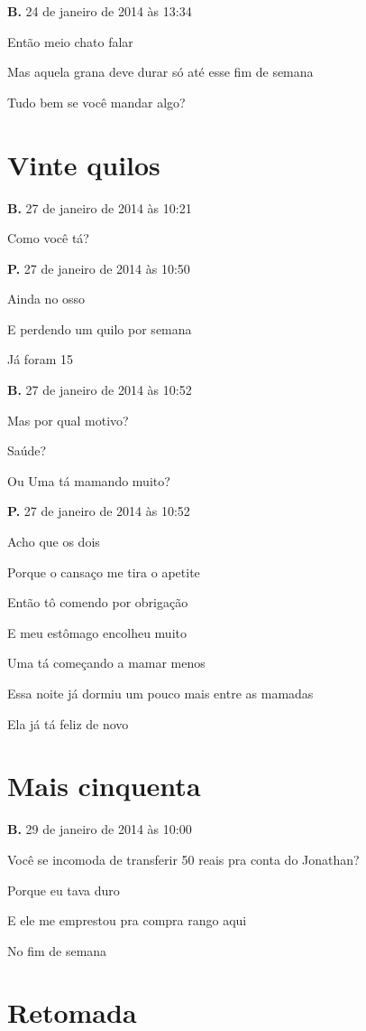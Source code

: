 \textbf{B.} 24 de janeiro de 2014 às 13:34

Então meio chato falar

Mas aquela grana deve durar só até esse fim de semana

Tudo bem se você mandar algo?

\chapter{Vinte quilos}

\textbf{B.} 27 de janeiro de 2014 às 10:21

Como você tá?

\textbf{P.} 27 de janeiro de 2014 às 10:50

Ainda no osso

E perdendo um quilo por semana

Já foram 15

\textbf{B.} 27 de janeiro de 2014 às 10:52

Mas por qual motivo?

Saúde?

Ou Uma tá mamando muito?

\textbf{P.} 27 de janeiro de 2014 às 10:52

Acho que os dois

Porque o cansaço me tira o apetite

Então tô comendo por obrigação

E meu estômago encolheu muito

Uma tá começando a mamar menos

Essa noite já dormiu um pouco mais entre as mamadas

Ela já tá feliz de novo

\chapter{Mais cinquenta}

\textbf{B.} 29 de janeiro de 2014 às 10:00

Você se incomoda de transferir 50 reais pra conta do Jonathan?

Porque eu tava duro

E ele me emprestou pra compra rango aqui

No fim de semana

\chapter{Retomada}

